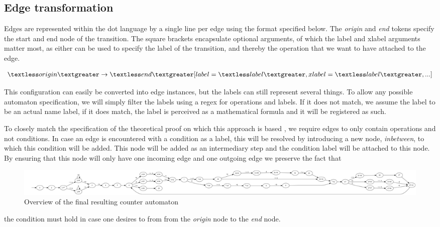 \documentclass[12pt]{thesis}
\begin{document}
\subsection{Edge transformation}
Edges are represented within the dot language by a single line per edge using the format specified below. The \textit{origin} and \textit{end} tokens specify the start and end node of the transition. The square brackets encapsulate optional arguments, of which the label and xlabel arguments matter most, as either can be used to specify the label of the transition, and thereby the operation that we want to have attached to the edge. 

\begin{gather*}
	\textless origin \textgreater \rightarrow \textless end\textgreater [label=\textless label\textgreater, xlabel=\textless label\textgreater, ...]
\end{gather*}

This configuration can easily be converted into edge instances, but the labels can still represent several things. To allow any possible automaton specification, we will simply filter the labels using a regex for operations and labels. If it does not match, we assume the label to be an actual name label, if it does match, the label is perceived as a mathematical formula and it will be registered as such. 

To closely match the specification of the theoretical proof on which this approach is based \cite{blondin2021continuous}, we require edges to only contain operations and not conditions. In case an edge is encountered with a condition as a label, this will be resolved by introducing a new node, \textit{inbetween}, to which this condition will be added. This node will be added as an intermediary step and the condition label will be attached to this node. By ensuring that this node will only have one incoming edge and one outgoing edge we preserve the fact that
\begin{landscape}
	\begin{figure}
		\centering
		\includegraphics[width=\linewidth]{final_overview_11}
		\caption{Overview of the final resulting counter automaton}
		\label{fig:final_overview_11}
	\end{figure}
\end{landscape}

\noindent
the condition must hold in case one desires to from from the \textit{origin} node to the \textit{end} node. 
\end{document}
